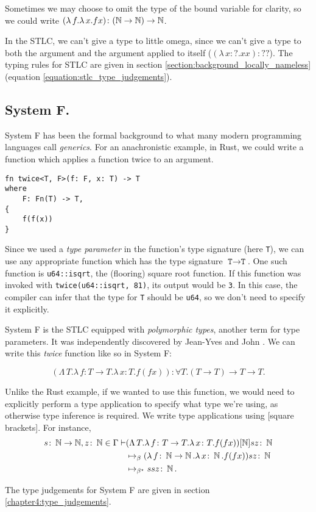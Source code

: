 Sometimes we may choose to omit the type of the bound variable for clarity, so we could write
$(\lambda \, f. \lambda \, x. fx) \colon (\operatorname{\mathbb{N}} \to \operatorname{\mathbb{N}}) \to \operatorname{\mathbb{N}}$.

In the STLC, we can't give a type to little omega, since we can't give a type to both the argument
and the argument applied to itself ($(\lambda \, x  \colon ? . x x) \colon ??$). The typing rules for
STLC are given in section \ref{section:background_locally_nameless} (equation \ref{equation:stlc_type_judgements}).

\subsection{System F.}
System F has been the formal background to what many modern programming
languages call \textit{generics}. For an anachronistic example, in Rust, we could write a function
which applies a function twice to an argument.

\begin{verbatim}
fn twice<T, F>(f: F, x: T) -> T
where
    F: Fn(T) -> T,
{
    f(f(x))
}
\end{verbatim}

Since we used a \textit{type parameter} in the function's type signature (here \texttt{T}), we can
use any appropriate function which has the type signature $\texttt{T} \to \texttt{T}$. One such
function is \texttt{u64::isqrt}, the (flooring) square root function. If this function was invoked
with \texttt{twice(u64::isqrt, 81)}, its output would be \texttt{3}. In this case, the compiler can
infer that the type for \texttt{T} should be \texttt{u64}, so we don't need to specify it
explicitly.

System F is the STLC equipped with \textit{polymorphic types}, another term for type parameters. It
was independently discovered by Jean-Yves \citet{girard_interpretation_1972} and John
\citet{goos_towards_1974}. We can write this \textit{twice} function like so in System F:

\begin{equation*}
  (\Lambda \, T. \lambda \, f \colon T \to T . \lambda \, x \colon T . f (f x))
  \colon \forall T . (T \to T) \to T \to T.
\end{equation*}

Unlike the Rust example, if we wanted to use this function, we would need to explicitly perform a
type application to specify what type we're using, as otherwise type inference is required. We write
type applications using [square brackets]. For instance,
\begin{align*}
  s \colon \operatorname{\mathbb{N}} \to \operatorname{\mathbb{N}}, z \colon \operatorname{\mathbb{N}} \in \Gamma \vdash
  &(\Lambda \, T. \lambda \, f \colon T \to T . \lambda \, x \colon T . f (f x))[\operatorname{\mathbb{N}}] s z \colon \operatorname{\mathbb{N}}\\
  &\mapsto_{\beta} (\lambda \, f \colon \operatorname{\mathbb{N}} \to \operatorname{\mathbb{N}} . \lambda \, x \colon \operatorname{\mathbb{N}} . f (f x)) s z \colon \operatorname{\mathbb{N}}\\
  &\mapsto_{\beta^{\star}} s s z \colon \operatorname{\mathbb{N}}.
\end{align*}

The type judgements for System F are given in section \ref{chapter4:type_judgements}.
